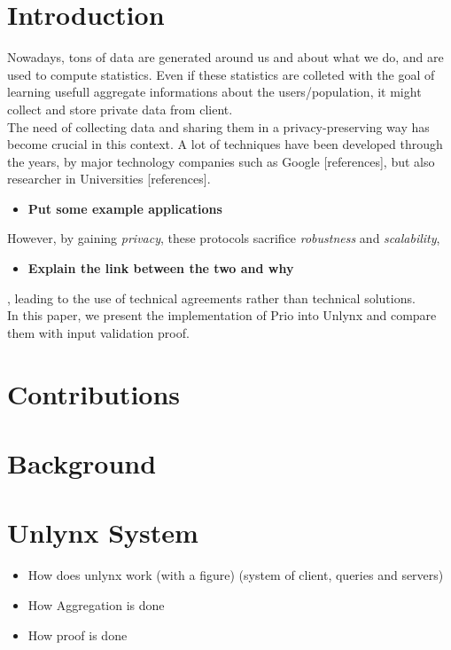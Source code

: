 \documentclass{article}
\begin{document}
\section*{Introduction}
Nowadays, tons of data are generated around us and about what we do, and are used to compute statistics. Even if these statistics are colleted with the goal of learning usefull aggregate informations about the users/population, it might collect and store private data from client.\\
The need of collecting data and sharing them in a privacy-preserving way has become crucial in this context. A lot of techniques have been developed through the years, by major technology companies such as Google [references], but also researcher in Universities [references].\\
\begin{itemize}
\item \textbf{Put some example applications}\\
\end{itemize}
However, by gaining \textit{privacy}, these protocols sacrifice \textit{robustness} and \textit{scalability},\\
\begin{itemize}
\item \textbf{Explain the link between the two and why}
\end{itemize}
, leading to the use of technical agreements rather than technical solutions.\\
In this paper, we present the implementation of Prio into Unlynx and compare them with input validation proof.

\section*{Contributions}
\section*{Background}

\section{Unlynx System}
\begin{itemize}
\item How does unlynx work (with a figure) (system of client, queries and servers)
\item How Aggregation is done
\item How proof is done
\end{itemize}
\end{document}
